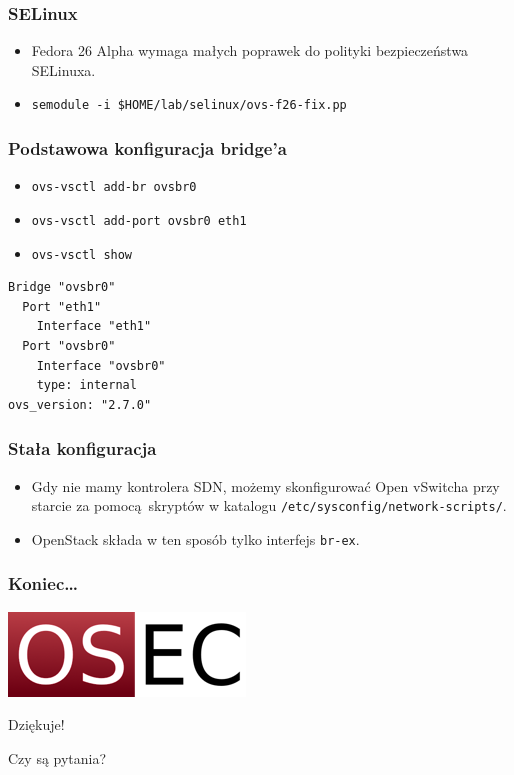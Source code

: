 \documentclass[dvipsnames,table]{beamer}
\begin{document}
\begin{frame}
\frametitle{SELinux}
\begin{itemize}
	\item Fedora 26 Alpha wymaga małych poprawek do polityki bezpieczeństwa SELinuxa.
	\item {\tt semodule -i \$HOME/lab/selinux/ovs-f26-fix.pp}
\end{itemize}	
\end{frame}

\begin{frame}[fragile]
\frametitle{Podstawowa konfiguracja bridge'a}
\begin{itemize}
	\item {\tt ovs-vsctl add-br ovsbr0}
	\item {\tt ovs-vsctl add-port ovsbr0 eth1}
	\item {\tt ovs-vsctl show}
\end{itemize}
	\scriptsize
\begin{verbatim}
Bridge "ovsbr0"
  Port "eth1"
    Interface "eth1"
  Port "ovsbr0"
    Interface "ovsbr0"
    type: internal
ovs_version: "2.7.0"
\end{verbatim}
\end{frame}
	
\begin{frame}
\frametitle{Stała konfiguracja}
\begin{itemize}
	\item Gdy nie mamy kontrolera SDN, możemy skonfigurować Open vSwitcha przy starcie za pomocą skryptów w katalogu {\tt /etc/sysconfig/network-scripts/}.
	\item OpenStack składa w ten sposób tylko interfejs {\tt br-ex}. 
\end{itemize}
\end{frame}

\begin{frame}
\frametitle{Koniec\ldots}
\begin{center}
\includegraphics[scale=0.5]{img-oseclogo.png}

Dziękuje!

Czy są pytania?

\end{center}
\end{frame}
\end{document}
